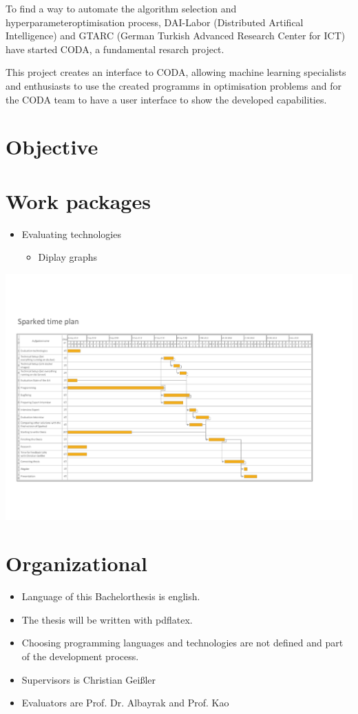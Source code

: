 \documentclass[12pt,a4paper,titlepage,oneside,BCOR1cm]{scrreprt}
\begin{document}
To find a way to automate the algorithm selection and hyperparameteroptimisation process, DAI-Labor 
(Distributed Artifical Intelligence) and GTARC (German Turkish Advanced Research Center for ICT) 
have started CODA, a fundamental resarch project. 

This project creates an interface to CODA, allowing machine learning specialists 
and enthusiasts to use the created programms in optimisation problems and for the CODA team to have a 
user interface to show the developed capabilities.

\chapter{Objective}

\chapter{Work packages}

\begin{itemize}
\item Evaluating technologies

\begin{itemize}
\item Diplay graphs
\end{itemize}
\end{itemize}

\hspace*{-1.5in}
\includegraphics[width=\paperwidth]{gantt-proposal-2.pdf}

\chapter{Organizational}
\begin{itemize}
\item Language of this Bachelorthesis is english.
\item The thesis will be written with pdflatex.
\item Choosing programming languages and technologies are not defined and part of the development process.
\item Supervisors is Christian Geißler
\item Evaluators are Prof. Dr. Albayrak and Prof. Kao \cite{inproceedings}
\end{itemize}
\end{document}
